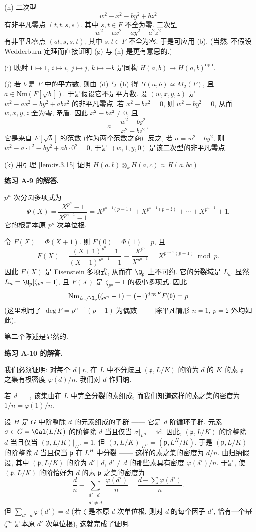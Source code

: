 (h) 二次型
\[
w^{2}-x^{2}-by^{2}+bz^{2}
\]
有非平凡零点 $(t,t,s,s)$, 其中 $s,t\in F$ 不全为零. 二次型
\[
w^{2}-ax^{2}+ay^{2}-a^{2}z^{2}
\]
有非平凡零点 $(at,s,s,t)$, 其中 $s,t\in F$ 不全为零. 于是可应用 (b). (当然, 不假设 Wedderburn 定理而直接证明 (g) 与 (h) 是更有意思的.)

(i) 映射 $1\mapsto1$, $i\mapsto i$, $j\mapsto j$, $k\mapsto-k$ 是同构 $H(a,b)\to H(a,b)^{\mathrm{opp}}$.

(j) 若 $b$ 是 $F$ 中的平方数, 则由 (d) 与 (h) 得 $H(a,b)\simeq M_2(F)$, 且 $a\in\mathrm{Nm}(F[\sqrt{b}])$. 于是假设它不是平方数. 设 $(w,x,y,z)$ 是 $w^{2}-ax^{2}-by^{2}+abz^{2}$ 的非平凡零点. 若 $x^{2}-bz^{2}=0$, 则 $w^{2}-by^{2}=0$, 从而 $w,x,y,z$ 全为零, 矛盾. 因此 $x^{2}-bz^{2}\ne0$, 且
\[
a=\frac{w^{2}-by^{2}}{x^{2}-bz^{2}},
\]
它是来自 $F[\sqrt{b}]$ 的范数 (作为两个范数之商). 反之, 若 $a=w^{2}-by^{2}$, 则 $w^{2}-a\cdot1^{2}-by^{2}+ab\cdot0^{2}=0$, 于是 $(w,1,y,0)$ 是该二次型的非平凡零点.

(k) 用引理 \ref{lem:iv.3.15} 证明 $H(a,b)\otimes_k H(a,c)\approx H(a,bc)$.

\noindent\textbf{练习 A-9 的解答.}

$p^{n}$ 次分圆多项式为
\[
\Phi(X)=\frac{X^{p^{n}}-1}{X^{p^{n-1}}-1}=X^{p^{n-1}(p-1)}+X^{p^{n-1}(p-2)}+\cdots+X^{p^{n-1}}+1.
\]
它的根是本原 $p^{n}$ 次单位根.

令 $F(X)=\Phi(X+1)$. 则 $F(0)=\Phi(1)=p$, 且
\[
F(X)=\frac{(X+1)^{p^{n}}-1}{(X+1)^{p^{n-1}}-1}\equiv\frac{X^{p^{n}}}{X^{p^{n-1}}}=X^{p^{n-1}(p-1)} \bmod p.
\]
因此 $F(X)$ 是 Eisenstein 多项式, 从而在 $\Q_p$ 上不可约. 它的分裂域是 $L_n$. 显然 $L_n=\Q_p[\zeta_{p^n}-1]$, 且 $F(X)$ 是 $\zeta_{p^n}-1$ 的极小多项式. 因此
\[
\mathrm{Nm}_{L_n/\Q_p}(\zeta_{p^n}-1)=(-1)^{\deg F}F(0)=p
\]
(这里利用了 $\deg F=p^{n-1}(p-1)$ 为偶数 —— 除平凡情形 $n=1$, $p=2$ 外均如此).

第二个陈述是显然的.

\noindent\textbf{练习 A-10 的解答.}

我们必须证明: 对每个 $d\mid n$, 在 $L$ 中不分歧且 $(\mathfrak{p},L/K)$ 的阶为 $d$ 的 $K$ 的素 $\mathfrak{p}$ 之集有极密度 $\varphi(d)/n$. 我们对 $d$ 作归纳.

若 $d=1$, 该集由在 $L$ 中完全分裂的素组成, 而我们知道这样的素之集的密度为 $1/n=\varphi(1)/n$.

设 $H$ 是 $G$ 中阶整除 $d$ 的元素组成的子群 —— 它是 $d$ 阶循环子群. 元素 $\sigma\in G=\Gal(L/K)$ 的阶整除 $d$ 当且仅当 $\sigma|_{L^{H}}=\mathrm{id}$. 因此, $(\mathfrak{p},L/K)$ 的阶整除 $d$ 当且仅当 $(\mathfrak{p},L/K)|_{L^{H}}=1$. 但 $(\mathfrak{p},L/K)|_{L^{H}}=(\mathfrak{p},L^{H}/K)$, 于是 $(\mathfrak{p},L/K)$ 的阶整除 $d$ 当且仅当 $\mathfrak{p}$ 在 $L^{H}$ 中分裂 —— 这样的素之集的密度为 $d/n$. 由归纳假设, 其中 $(\mathfrak{p},L/K)$ 的阶为 $d'\mid d$, $d'\ne d$ 的那些素具有密度 $\varphi(d')/n$. 于是, 使 $(\mathfrak{p},L/K)$ 的阶恰好为 $d$ 的素 $\mathfrak{p}$ 之集的密度为
\[
\frac{d}{n}-\sum_{\substack{d'\mid d\\ d'\ne d}}\frac{\varphi(d')}{n}
=\frac{d-\sum\varphi(d')}{n}.
\]
但 $\sum_{d'\mid d}\varphi(d')=d$ (若 $\zeta$ 是本原 $d$ 次单位根, 则对 $d$ 的每个因子 $d'$, 恰有一个幂 $\zeta^{m}$ 是本原 $d'$ 次单位根), 这就完成了证明.

